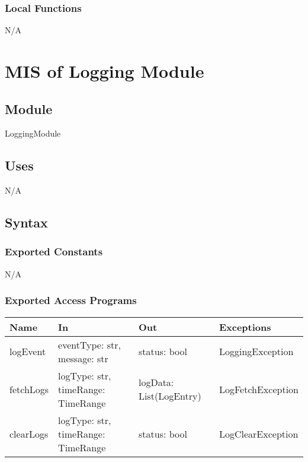 \documentclass[12pt, titlepage]{article}
\begin{document}
\subsubsection{Local Functions}
N/A

\newpage
\section{MIS of Logging Module} \label{LoggingModule}

\subsection{Module}
LoggingModule

\subsection{Uses}
N/A

\subsection{Syntax}

\subsubsection{Exported Constants}
N/A

\subsubsection{Exported Access Programs}

\begin{center}
\begin{tabular}{p{3cm} p{4cm} p{4cm} p{5cm}}
\hline
\textbf{Name} & \textbf{In} & \textbf{Out} & \textbf{Exceptions} \\
\hline
logEvent & \raggedright\arraybackslash eventType: str, message: str & \raggedright\arraybackslash status: bool & \raggedright\arraybackslash LoggingException \\
\hline
fetchLogs & \raggedright\arraybackslash logType: str, timeRange: TimeRange & \raggedright\arraybackslash logData: List(LogEntry) & \raggedright\arraybackslash LogFetchException \\
\hline
clearLogs & \raggedright\arraybackslash logType: str, timeRange: TimeRange & \raggedright\arraybackslash status: bool & \raggedright\arraybackslash LogClearException \\
\hline
\end{tabular}
\end{center}
\end{document}
